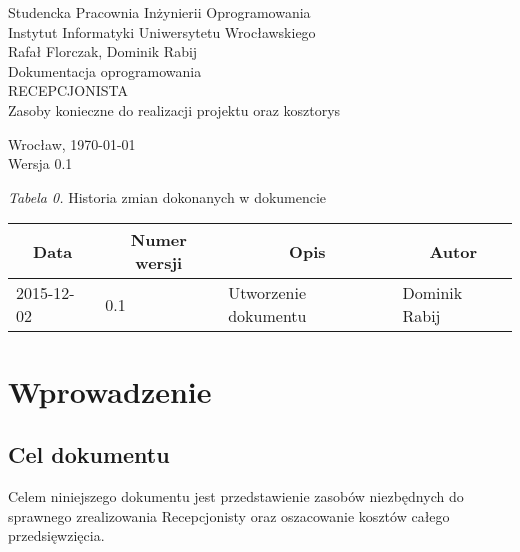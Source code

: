 \documentclass [11pt, a4paper, leqno] {article}
\begin{document}

\begin{center}
  \thispagestyle{empty} %
  {\large Studencka Pracownia Inżynierii Oprogramowania} \\ [0.5cm]
	{\large Instytut Informatyki Uniwersytetu Wrocławskiego} \\ [6.0cm]

  {\large Rafał Florczak, Dominik Rabij} \\ [1.5cm]

	{\huge Dokumentacja oprogramowania} \\ [0.5cm]
  {\huge RECEPCJONISTA} \\ [1.5cm]

  {\large Zasoby konieczne do realizacji projektu oraz kosztorys} \\ [0.5cm]

  \vfill
  
  {\large Wrocław, \today} \\ [0.5cm]
  {\large Wersja 0.1}
\end{center}

\newpage


\textit{Tabela 0.} Historia zmian dokonanych w dokumencie

\begin{center}
  \begin{tabular}{| l | l | l | l |}
    \hline
    \multicolumn{1}{|c|}{Data} & 
    \multicolumn{1}{|c|}{Numer wersji} &  
    \multicolumn{1}{|c|}{Opis} &
    \multicolumn{1}{|c|}{Autor} \\ \hline \hline
    2015-12-02 & 0.1 & Utworzenie dokumentu & Dominik Rabij \\ \hline
  \end{tabular}
\end{center}

\medskip

\tableofcontents

\newpage

\section{Wprowadzenie}

\subsection{Cel dokumentu}
\noindent
Celem niniejszego dokumentu jest przedstawienie zasobów niezbędnych do sprawnego zrealizowania Recepcjonisty oraz oszacowanie kosztów całego przedsięwzięcia. 
\end{document}
